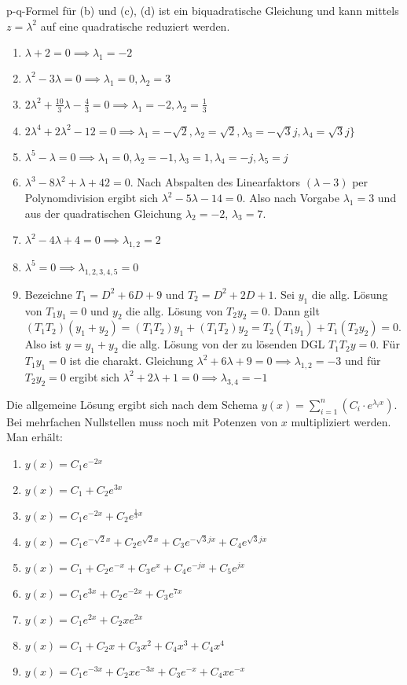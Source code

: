 \item p-q-Formel für (b) und (c), (d) ist ein biquadratische Gleichung und kann mittels $z = \lambda^2$ auf eine quadratische reduziert werden.

\begin{enumerate}
\item $\lambda + 2 = 0 \implies \lambda_1 = -2$
\item $\lambda^2-3\lambda=0 \implies \lambda_1 = 0, \lambda_2 = 3$
\item $2\lambda^2+\frac{10}{3}\lambda-\frac{4}{3}=0 \implies \lambda_1 = -2, \lambda_2 = \frac{1}{3}$
\item $2\lambda^4+2\lambda^2-12=0 \implies \lambda_1=-\sqrt{2}, \lambda_2=\sqrt{2}, \lambda_3=-\sqrt{3}j, \lambda_4=\sqrt{3}j \rbrace$
\item $\lambda^5-\lambda = 0 \implies \lambda_1 = 0, \lambda_2 = -1, \lambda_3 = 1, \lambda_4 = -j, \lambda_5 = j$
\item $\lambda^3-8\lambda^2+\lambda+42=0$. Nach Abspalten des Linearfaktors $(\lambda-3)$ per Polynomdivision ergibt sich $\lambda^2-5\lambda-14=0$. Also nach Vorgabe $\lambda_1 = 3$ und aus der quadratischen Gleichung $\lambda_2 = -2$, $\lambda_3=7$.
\item $\lambda^2-4\lambda+4=0 \implies \lambda_{1,2} = 2$
\item $\lambda^5 = 0 \implies \lambda_{1,2,3,4,5} = 0$
\item Bezeichne $T_1=D^2+6D+9$ und $T_2=D^2+2D+1$. Sei $y_1$ die allg. Lösung von $T_1y_1=0$ und $y_2$ die allg. Lösung von $T_2y_2=0$. Dann gilt $(T_1T_2)(y_1+y_2) = (T_1T_2)y_1 + (T_1T_2)y_2 = T_2(T_1y_1)+T_1(T_2y_2) = 0$. Also ist $y=y_1+y_2$ die allg. Lösung von der zu lösenden DGL $T_1T_2y=0$. Für $T_1y_1=0$ ist die charakt. Gleichung $\lambda^2+6\lambda+9=0 \implies \lambda_{1,2} = -3$ und für $T_2y_2=0$ ergibt sich $\lambda^2+2\lambda+1=0 \implies \lambda_{3,4} = -1$
\end{enumerate}

Die allgemeine Lösung ergibt sich nach dem Schema $y(x) = \sum\limits_{i=1}^{n} \left( C_i \cdot e^{\lambda_i x} \right)$. Bei mehrfachen Nullstellen muss noch mit Potenzen von $x$ multipliziert werden. Man erhält:

\begin{enumerate}
	\item $ y(x) = C_1 e^{-2x}$
	\item $ y(x) = C_1 + C_2 e^{3x}$
	\item $ y(x) = C_1 e^{-2x} + C_2 e^{\frac{1}{3}x}$
	\item $ y(x) = C_1 e^{-\sqrt{2}x} + C_2 e^{\sqrt{2}x} + C_3 e^{-\sqrt{3}jx} + C_4 e^{\sqrt{3}jx}$
	\item $ y(x) = C_1 + C_2 e^{-x} + C_3 e^{x} + C_4 e^{-jx} + C_5 e^{jx} $
	\item $ y(x) = C_1 e^{3x} + C_2 e^{-2x} + C_3 e^{7x} $ 
	\item $ y(x) = C_1 e^{2x} + C_2 x e^{2x}$
	\item $ y(x) = C_1 + C_2 x + C_3 x^2 + C_4 x^3 + C_4 x^4$
	\item $ y(x) = C_1 e^{-3x} + C_2 x e^{-3x} + C_3 e^{-x} + C_4 x e^{-x} $
\end{enumerate}



